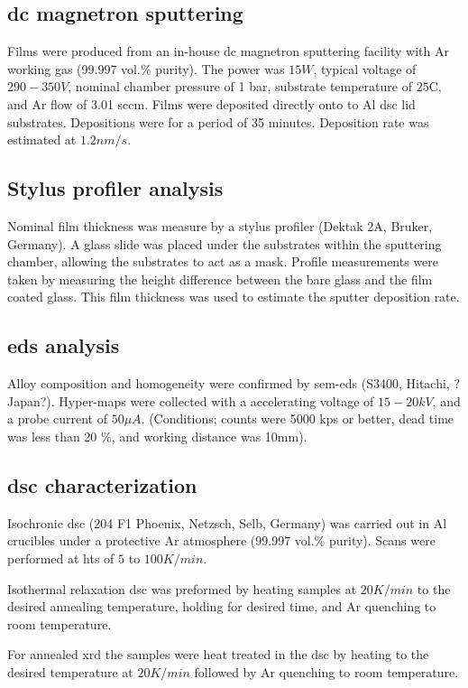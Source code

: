 \documentclass[a4paper,12pt,oneside]{article}%
\begin{document}
\subsection{\acrshort{dc} magnetron sputtering}
Films were produced from an in-house \acrshort{dc} magnetron sputtering facility with Ar working gas (99.997 vol.\% purity). The power was $15W$, typical voltage of $290-350V$, nominal chamber pressure of 1 bar, substrate temperature of $25$\degree C, and Ar flow of 3.01 \acrshort{sccm}. Films were deposited directly onto to Al \acrshort{dsc} lid substrates. Depositions were for a period of 35 minutes. Deposition rate was estimated at $1.2 nm/s$. 

\subsection{Stylus profiler analysis}
Nominal film thickness was measure by a stylus profiler (Dektak 2A, Bruker, Germany). A glass slide was placed under the substrates within the sputtering chamber, allowing the substrates to act as a mask. Profile measurements were taken by measuring the height difference between the bare glass and the film coated glass. This film thickness was used to estimate the sputter deposition rate.  

\subsection{\acrshort{eds} analysis}
Alloy composition and homogeneity were confirmed by \acrshort{sem}-\acrshort{eds} (S3400, Hitachi, ?Japan?). Hyper-maps were collected with a accelerating voltage of $15-20kV$, and a probe current of $50 \mu A$. (Conditions; counts were 5000 kps or better, dead time was less than 20 \%, and working distance was 10mm). 

\subsection{\acrshort{dsc} characterization}
Isochronic \acrshort{dsc} (204 F1 Phoenix, Netzsch, Selb, Germany) was carried out in Al crucibles under a protective Ar atmosphere (99.997 vol.\% purity). Scans were performed at \glspl{ht} of $5$ to $100 K/min$. 

Isothermal relaxation \acrshort{dsc} was preformed by heating samples at $20 K/min$ to the desired annealing temperature, holding for desired time, and Ar quenching to room temperature.

For annealed \acrshort{xrd} the samples were heat treated in the \acrshort{dsc} by heating to the desired temperature at $20 K/min$ followed by Ar quenching to room temperature.
\end{document}
